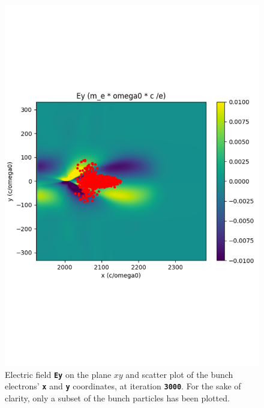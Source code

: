 \documentclass[a4paper,12pt]{extarticle}
\newcommand{\commandline}[1]{\texttt{\textbf{#1}}}
\begin{document}
\begin{figure}[!htb]
\begin{minipage}{0.48\textwidth}
     \includegraphics[width=1\linewidth]{EyScatterXY.pdf}
     \caption{Electric field \commandline{Ey} on the plane $xy$ and scatter plot of the bunch electrons' \commandline{x} and \commandline{y} coordinates, at iteration \commandline{3000}. For the sake of clarity, only a subset of the bunch particles has been plotted.}\label{EyScatterXY}
   \end{minipage}
\end{figure}


\appendix
\end{document}
